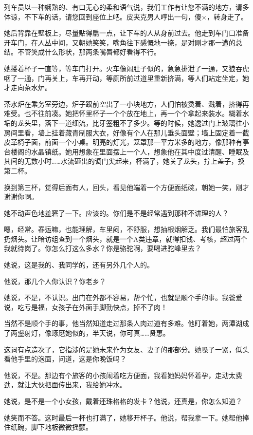 \documentclass[lang=cn,newtx,12pt,scheme=chinese]{elegantbook}
\begin{document}
列车员以一种娴熟的、有口无心的柔和语气说，我们工作有让您不满的地方，请多体谅，不下车的话，请您回到座位上吧。皮夹克男人哼出一句，傻×，转身走了。

她后背靠在壁板上，尽量贴得扁一点，让下车的人从身前过去。他走到车门口准备开车门，在人丛中间，又朝她笑笑，嘴角往下感慨地一捺，是对刚才那一遭的总结。不管笑成什么形状，那两条嘴唇都好看得不行。

她搂着杯子一直等，等车门打开。火车像闹肚子似的，急急排泄了一通，又狼吞虎咽了一通，门再关上，车再开动，等厕所前过道里重新挤满，等人们站定坐定，她才走向茶水炉。

茶水炉在乘务室旁边，炉子跟前空出了一小块地方，人们怕被烫着、溅着，挤得再难受。也不往前凑。她把怀里杯子一个个放在地上，再一个个拿起来装水。糊着水垢的龙头里，落下一道细流，比牙签粗不了多少。等的时候，她透过门上玻璃往小房间里看，墙上挂着藏青制服大衣，好像有个人在那儿垂头面壁；墙上固定着一截皮革椅子面，前面一个小桌。明亮的灯光，笼罩那一平方米多的地方，像那种有亭台楼阁的水晶镇纸。她用想象在里面摆上一个人，想象他在其中度过清醒、睡眠及其间的无数小时……水流砸出的调门尖起来，杯满了，她关了龙头，拧上盖子，换第二杯。

换到第三杯，觉得后面有人，回头，看见他端着一个方便面纸碗，朝她一笑，刚才谢谢你啊。

她不动声色地羞窘了一下。应该的。你们是不是经常遇到那种不讲理的人？

嗯，经常。春运嘛，也能理解，车里闷，不舒服，想抽根烟解乏。我们最怕旅客乱扔烟头。让暗访组查到一个烟头，就是一个A类违章，就得扣钱、考核，超过两个我就待岗了。你怎么打这么多水？你是骆驼啊，要喝进驼峰里去？

她说，这是我的、我同学的，还有另外几个人的。

他说，那几个人你认识？你老乡？

她说，不是，不认识。出门在外都不容易，帮个忙，也就是顺个手的事。我爸爱说，吃亏是福，女孩子在外面手脚勤快点，掉不了肉！

当然不是顺个手的事，他当然知道走过那条人肉过道有多难。他盯着她，两潭湖成了两盏射灯，像琢磨她似的，半天说，你可真……贤惠。

这词有点造次了，它指涉的是她未来作为女友、妻子的那部分。她嗓子一紧，低头看他手里的泡面，问道，这是你晚饭吗？

他说，不是。那边有个旅客的小孩闹着吃方便面，我看她妈妈怀着孕，走动太费劲，就让大伙把面传出来，我给她冲水。

她说，是不是一个小女孩，戴着还珠格格的发卡？他说，还真是，你怎么知道？

她笑而不答。这时最后一杯也打满了，她移开杯子。他说，帮我拿一下。她帮他捧住纸碗，脚下地板微微摇颤。
\end{document}
